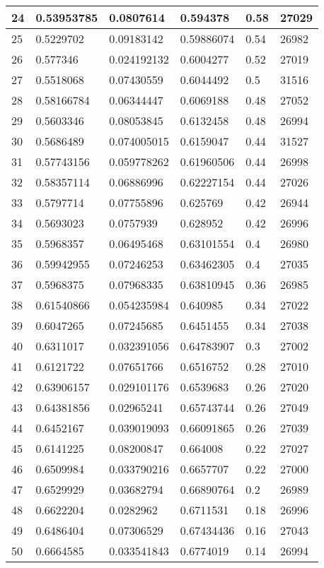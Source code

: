 \begin{longtable}{|l|l|l|l|l|l|}
24 & 0.53953785 & 0.0807614 & 0.594378 & 0.58 & 27029 \\ \hline 
25 & 0.5229702 & 0.09183142 & 0.59886074 & 0.54 & 26982 \\ \hline 
26 & 0.577346 & 0.024192132 & 0.6004277 & 0.52 & 27019 \\ \hline 
27 & 0.5518068 & 0.07430559 & 0.6044492 & 0.5 & 31516 \\ \hline 
28 & 0.58166784 & 0.06344447 & 0.6069188 & 0.48 & 27052 \\ \hline 
29 & 0.5603346 & 0.08053845 & 0.6132458 & 0.48 & 26994 \\ \hline 
30 & 0.5686489 & 0.074005015 & 0.6159047 & 0.44 & 31527 \\ \hline 
31 & 0.57743156 & 0.059778262 & 0.61960506 & 0.44 & 26998 \\ \hline 
32 & 0.58357114 & 0.06886996 & 0.62227154 & 0.44 & 27026 \\ \hline 
33 & 0.5797714 & 0.07755896 & 0.625769 & 0.42 & 26944 \\ \hline 
34 & 0.5693023 & 0.0757939 & 0.628952 & 0.42 & 26996 \\ \hline 
35 & 0.5968357 & 0.06495468 & 0.63101554 & 0.4 & 26980 \\ \hline 
36 & 0.59942955 & 0.07246253 & 0.63462305 & 0.4 & 27035 \\ \hline 
37 & 0.5968375 & 0.07968335 & 0.63810945 & 0.36 & 26985 \\ \hline 
38 & 0.61540866 & 0.054235984 & 0.640985 & 0.34 & 27022 \\ \hline 
39 & 0.6047265 & 0.07245685 & 0.6451455 & 0.34 & 27038 \\ \hline 
40 & 0.6311017 & 0.032391056 & 0.64783907 & 0.3 & 27002 \\ \hline 
41 & 0.6121722 & 0.07651766 & 0.6516752 & 0.28 & 27010 \\ \hline 
42 & 0.63906157 & 0.029101176 & 0.6539683 & 0.26 & 27020 \\ \hline 
43 & 0.64381856 & 0.02965241 & 0.65743744 & 0.26 & 27049 \\ \hline 
44 & 0.6452167 & 0.039019093 & 0.66091865 & 0.26 & 27039 \\ \hline 
45 & 0.6141225 & 0.08200847 & 0.664008 & 0.22 & 27027 \\ \hline 
46 & 0.6509984 & 0.033790216 & 0.6657707 & 0.22 & 27000 \\ \hline 
47 & 0.6529929 & 0.03682794 & 0.66890764 & 0.2 & 26989 \\ \hline 
48 & 0.6622204 & 0.0282962 & 0.6711531 & 0.18 & 26996 \\ \hline 
49 & 0.6486404 & 0.07306529 & 0.67434436 & 0.16 & 27043 \\ \hline 
50 & 0.6664585 & 0.033541843 & 0.6774019 & 0.14 & 26994 \\ \hline 
\end{longtable}